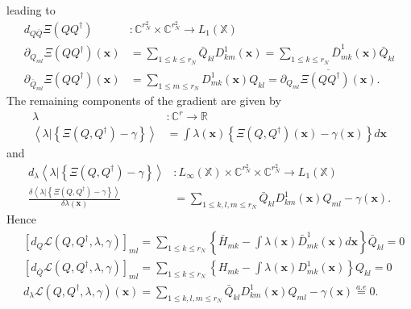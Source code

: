 \documentclass[aps,preprint]{revtex4}%
\begin{document}
leading to
\begin{align}
d_{Q\bar{Q}}\Xi\left(  QQ^{\dagger}\right)   &  :\mathbb{C}^{r_{N}^{2}}%
\times\mathbb{C}^{r_{N}^{2}}\rightarrow L_{1}\left(  \mathbb{X}\right)
\nonumber\\
\partial_{Q_{ml}}\Xi\left(  QQ^{\dagger}\right)  \left(  \mathbf{x}\right)
&  =\sum_{1\leq k\leq r_{N}}\bar{Q}_{kl}D_{km}^{1}\left(  \mathbf{x}\right)
=\sum_{1\leq k\leq r_{N}}\bar{D}_{mk}^{1}\left(  \mathbf{x}\right)  \bar
{Q}_{kl}\nonumber\\
\partial_{\bar{Q}_{ml}}\Xi\left(  QQ^{\dagger}\right)  \left(  \mathbf{x}%
\right)   &  =\sum_{1\leq m\leq r_{N}}D_{mk}^{1}\left(  \mathbf{x}\right)
Q_{kl}=\overline{\partial_{Q_{ml}}\Xi\left(  QQ^{\dagger}\right)  \left(
\mathbf{x}\right)  }.
\end{align}
The remaining components of the gradient are given by
\begin{align}
\lambda &  :\mathbb{C}^{r}\rightarrow\mathbb{R}\nonumber\\
\left\langle \left.  \lambda\right\vert \left\{  \Xi\left(  Q,Q^{\dagger
}\right)  -\gamma\right\}  \right\rangle  &  =\int\lambda\left(
\mathbf{x}\right)  \left\{  \Xi\left(  Q,Q^{\dagger}\right)  \left(
\mathbf{x}\right)  -\gamma\left(  \mathbf{x}\right)  \right\}  d\mathbf{x}%
\end{align}
and
\begin{align}
d_{\lambda}\left\langle \left.  \lambda\right\vert \left\{  \Xi\left(
Q,Q^{\dagger}\right)  -\gamma\right\}  \right\rangle  &  :L_{\infty}\left(
\mathbb{X}\right)  \times\mathbb{C}^{r_{N}^{2}}\times\mathbb{C}^{r_{N}^{2}%
}\rightarrow L_{1}\left(  \mathbb{X}\right) \nonumber\\
\frac{\delta\left\langle \left.  \lambda\right\vert \left\{  \Xi\left(
Q,Q^{\dagger}\right)  -\gamma\right\}  \right\rangle }{\delta\lambda\left(
\mathbf{x}\right)  }  &  =\sum_{1\leq k,l,m\leq r_{N}}\bar{Q}_{kl}D_{km}%
^{1}\left(  \mathbf{x}\right)  Q_{ml}-\gamma\left(  \mathbf{x}\right)  .
\end{align}
Hence
\begin{align}
&  \left[  d_{Q}\mathcal{L}\left(  Q,Q^{\dagger},\lambda,\gamma\right)
\right]  _{ml}=\sum_{1\leq k\leq r_{N}}\left\{  \bar{H}_{mk}-\int%
\lambda\left(  \mathbf{x}\right)  \bar{D}_{mk}^{1}\left(  \mathbf{x}\right)
d\mathbf{x}\right\}  \bar{Q}_{kl}=0\nonumber\\
&  \left[  d_{\bar{Q}}\mathcal{L}\left(  Q,Q^{\dagger},\lambda,\gamma\right)
\right]  _{ml}=\sum_{1\leq k\leq r_{N}}\left\{  H_{mk}-\int\lambda\left(
\mathbf{x}\right)  D_{mk}^{1}\left(  \mathbf{x}\right)  \right\}
Q_{kl}=0\nonumber\\
&  d_{\lambda}\mathcal{L}\left(  Q,Q^{\dagger},\lambda,\gamma\right)  \left(
\mathbf{x}\right)  =\sum_{1\leq k,l,m\leq r_{N}}\bar{Q}_{kl}D_{km}^{1}\left(
\mathbf{x}\right)  Q_{ml}-\gamma\left(  \mathbf{x}\right)  \overset{a.e}{=}0.
\end{align}
\end{document}
